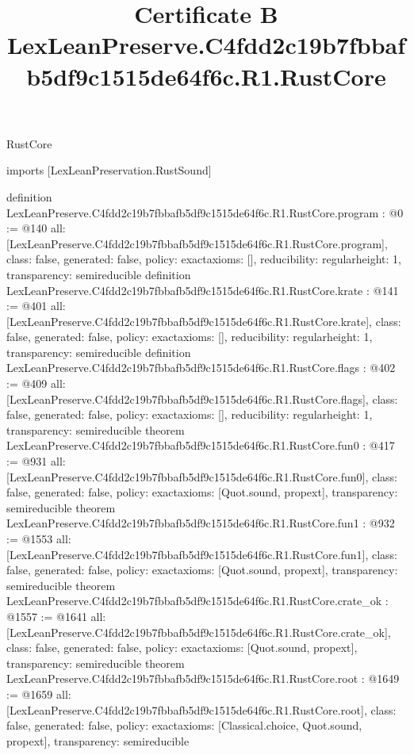 \begin{lexlean}{RustCore}
\title{Certificate B LexLeanPreserve.C4fdd2c19b7fbbafb5df9c1515de64f6c.R1.RustCore}
\begin{coremodule}
imports [LexLeanPreservation.RustSound]

definition LexLeanPreserve.C4fdd2c19b7fbbafb5df9c1515de64f6c.R1.RustCore.program : @0 := @140 {
  all: [LexLeanPreserve.C4fdd2c19b7fbbafb5df9c1515de64f6c.R1.RustCore.program],
  class: false,
  generated: false,
  policy: exact{axioms: []},
  reducibility: regular{height: 1},
  transparency: semireducible
}
definition LexLeanPreserve.C4fdd2c19b7fbbafb5df9c1515de64f6c.R1.RustCore.krate : @141 := @401 {
  all: [LexLeanPreserve.C4fdd2c19b7fbbafb5df9c1515de64f6c.R1.RustCore.krate],
  class: false,
  generated: false,
  policy: exact{axioms: []},
  reducibility: regular{height: 1},
  transparency: semireducible
}
definition LexLeanPreserve.C4fdd2c19b7fbbafb5df9c1515de64f6c.R1.RustCore.flags : @402 := @409 {
  all: [LexLeanPreserve.C4fdd2c19b7fbbafb5df9c1515de64f6c.R1.RustCore.flags],
  class: false,
  generated: false,
  policy: exact{axioms: []},
  reducibility: regular{height: 1},
  transparency: semireducible
}
theorem LexLeanPreserve.C4fdd2c19b7fbbafb5df9c1515de64f6c.R1.RustCore.fun0 : @417 := @931 {
  all: [LexLeanPreserve.C4fdd2c19b7fbbafb5df9c1515de64f6c.R1.RustCore.fun0],
  class: false,
  generated: false,
  policy: exact{axioms: [Quot.sound, propext]},
  transparency: semireducible
}
theorem LexLeanPreserve.C4fdd2c19b7fbbafb5df9c1515de64f6c.R1.RustCore.fun1 : @932 := @1553 {
  all: [LexLeanPreserve.C4fdd2c19b7fbbafb5df9c1515de64f6c.R1.RustCore.fun1],
  class: false,
  generated: false,
  policy: exact{axioms: [Quot.sound, propext]},
  transparency: semireducible
}
theorem LexLeanPreserve.C4fdd2c19b7fbbafb5df9c1515de64f6c.R1.RustCore.crate_ok : @1557 := @1641 {
  all: [LexLeanPreserve.C4fdd2c19b7fbbafb5df9c1515de64f6c.R1.RustCore.crate_ok],
  class: false,
  generated: false,
  policy: exact{axioms: [Quot.sound, propext]},
  transparency: semireducible
}
theorem LexLeanPreserve.C4fdd2c19b7fbbafb5df9c1515de64f6c.R1.RustCore.root : @1649 := @1659 {
  all: [LexLeanPreserve.C4fdd2c19b7fbbafb5df9c1515de64f6c.R1.RustCore.root],
  class: false,
  generated: false,
  policy: exact{axioms: [Classical.choice, Quot.sound, propext]},
  transparency: semireducible
}


\end{coremodule}
\end{lexlean}
